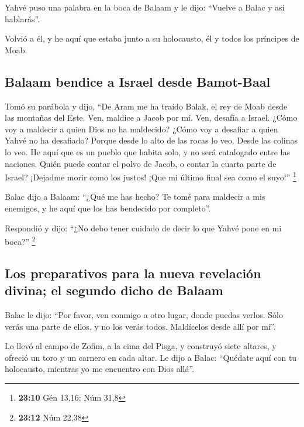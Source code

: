 \begin{paracol}{2}
 Yahvé puso una palabra en la boca de Balaam y le dijo:
``Vuelve a Balac y así hablarás''.

 Volvió a él, y he aquí que estaba junto a su holocausto,
él y todos los príncipes de Moab.

\hypertarget{balaam-bendice-a-israel-desde-bamot-baal}{%
\subsection{Balaam bendice a Israel desde
Bamot-Baal}\label{balaam-bendice-a-israel-desde-bamot-baal}}

 Tomó su parábola y dijo, ``De Aram me ha traído Balak, el
rey de Moab desde las montañas del Este. Ven, maldice a Jacob por mí.
Ven, desafía a Israel.  ¿Cómo voy a maldecir a quien Dios
no ha maldecido? ¿Cómo voy a desafiar a quien Yahvé no ha desafiado?
 Porque desde lo alto de las rocas lo veo. Desde las
colinas lo veo. He aquí que es un pueblo que habita solo, y no será
catalogado entre las naciones.  Quién puede contar el
polvo de Jacob, o contar la cuarta parte de Israel? ¡Dejadme morir como
los justos! ¡Que mi último final sea como el suyo!'' \footnote{\textbf{23:10}
  Gén 13,16; Núm 31,8}

 Balac dijo a Balaam: ``¿Qué me has hecho? Te tomé para
maldecir a mis enemigos, y he aquí que los has bendecido por completo''.

 Respondió y dijo: ``¿No debo tener cuidado de decir lo
que Yahvé pone en mi boca?'' \footnote{\textbf{23:12} Núm 22,38}

\hypertarget{los-preparativos-para-la-nueva-revelaciuxf3n-divina-el-segundo-dicho-de-balaam}{%
\subsection{Los preparativos para la nueva revelación divina; el segundo
dicho de
Balaam}\label{los-preparativos-para-la-nueva-revelaciuxf3n-divina-el-segundo-dicho-de-balaam}}

 Balac le dijo: ``Por favor, ven conmigo a otro lugar,
donde puedas verlos. Sólo verás una parte de ellos, y no los verás
todos. Maldícelos desde allí por mí''.

 Lo llevó al campo de Zofim, a la cima del Pisga, y
construyó siete altares, y ofreció un toro y un carnero en cada altar.
 Le dijo a Balac: ``Quédate aquí con tu holocausto,
mientras yo me encuentro con Dios allá''.


\end{paracol}
